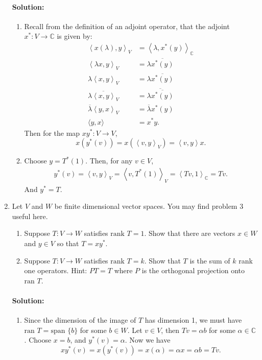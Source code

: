 \documentclass{article}
\begin{document}
\begin{enumerate}
\paragraph{Solution: } 
\begin{enumerate}[label= (\alph*)] 
    \item Recall from the definition of an adjoint operator, that the adjoint $x^* :V\to \mathbb{C}$ is given by:
        \begin{align*}
            \left< x(\lambda),y \right>_V &=\left<\lambda,x^* (y) \right>_{\mathbb{C}}\\
            \left<\lambda x,y \right>_V&= \lambda \overline{x^* (y)} \\
            \lambda\left< x,y \right>_V&= \lambda \overline{x^* (y)} \\
            \overline{\lambda\left< x,y \right>_V}&= \overline{\lambda \overline{x^* (y)}} \\
            \overline{\lambda}\left< y,x \right>_V&= \overline{\lambda} {x^* (y)} \\
            \langle y, x\rangle&= x^* y
        .\end{align*}
        Then for the map $xy^* :V\to V$, 
        \[
            x(y^* (v))=x(\left<v,y \right>_V)=\left<v,y \right> x
        .\] 
    \item Choose $y=T^* (1).$ Then, for any $v\in V$, 
        \begin{align*}
            y^* (v)=\left<v,y \right>_V=\left<v,T^* (1) \right>_V = \left<Tv,1 \right>_{\mathbb{C}}=Tv
        .\end{align*}
        And $y^* =T$.
\end{enumerate}

\item Let $V$ and $W$ be finite dimensional vector spaces. You may find problem 3 useful here. \begin{enumerate}[label= (\alph*)] 
    \item Suppose $T: V \to W$ satisfies $\text{rank } T = 1$. Show that there are vectors $x \in W$ and $y \in V$ so that $T = xy^*$.
    \item Suppose $T: V \to W$ satisfies $\text{rank } T = k$. Show that $T$ is the sum of $k$ rank one operators. Hint: $PT = T$ where $P$ is the orthogonal projection onto $\text{ran } T$.
\end{enumerate}
\paragraph{Solution: }
\begin{enumerate}[label= (\alph*)] 
    \item Since the dimension of the image of $T$ has dimension 1, we must have $\text{ran }T=\text{span }\{b\} $ for some $b\in W$. Let $v\in V$, then $Tv=\alpha b$ for some $\alpha\in \mathbb{C}$. Choose $x=b$, and $y^*(v)=\alpha$. Now we have 
        \[
        xy^* (v)=x(y^* (v))=x(\alpha)=\alpha x=\alpha b= Tv
        .\] 


\end{enumerate}
\end{enumerate}
\end{document}
